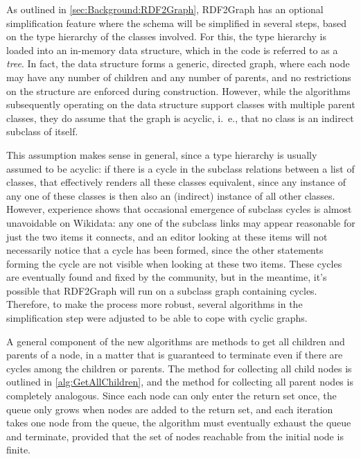 As outlined in \cref{sec:Background:RDF2Graph}, %
RDF2Graph has an optional simplification feature
where the schema will be simplified in several steps,
based on the type hierarchy of the classes involved.
For this, the type hierarchy is loaded into an in-memory data structure,
which in the code is referred to as a \emph{tree}. %
In fact, the data structure forms a generic, directed graph,
where each node may have any number of children and any number of parents,
and no restrictions on the structure are enforced during construction.
However, while the algorithms subsequently operating on the data structure support classes with multiple parent classes,
they do assume that the graph is acyclic,
i.~e., that no class is an indirect subclass of itself.

This assumption makes sense in general,
since a type hierarchy is usually assumed to be acyclic:
if there is a cycle in the subclass relations between a list of classes,
that effectively renders all these classes equivalent,
since any instance of any one of these classes is then also an (indirect) instance of all other classes.
However, experience shows %
that occasional emergence of subclass cycles is almost unavoidable on Wikidata:
any one of the subclass links may appear reasonable for just the two items it connects,
and an editor looking at these items will not necessarily notice that a cycle has been formed,
since the other statements forming the cycle are not visible when looking at these two items.
These cycles are eventually found and fixed by the community,
but in the meantime, it’s possible that RDF2Graph will run on a subclass graph containing cycles.
Therefore, to make the process more robust, %
several algorithms in the simplification step were adjusted to be able to cope with cyclic graphs.

A general component of the new algorithms are methods to get all children and parents of a node,
in a matter that is guaranteed to terminate even if there are cycles among the children or parents.
The method for collecting all child nodes is outlined in \cref{alg:GetAllChildren},
and the method for collecting all parent nodes is completely analogous.
Since each node can only enter the return set once,
the queue only grows when nodes are added to the return set,
and each iteration takes one node from the queue,
the algorithm must eventually exhaust the queue and terminate,
provided that the set of nodes reachable from the initial node is finite.

